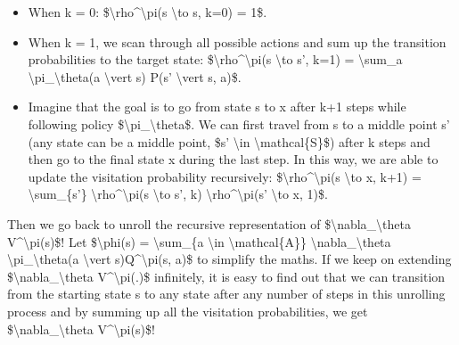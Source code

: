 \begin{itemize}
\tightlist
\item
  When k = 0: \$\textbackslash rho\^{}\textbackslash pi(s \textbackslash to s, k=0) = 1\$.
\item
  When k = 1, we scan through all possible actions and sum up the transition probabilities to the target state: \$\textbackslash rho\^{}\textbackslash pi(s \textbackslash to s', k=1) = \textbackslash sum\_a \textbackslash pi\_\textbackslash theta(a \textbackslash vert s) P(s' \textbackslash vert s, a)\$.
\item
  Imagine that the goal is to go from state s to x after k+1 steps while following policy \$\textbackslash pi\_\textbackslash theta\$. We can first travel from s to a middle point s' (any state can be a middle point, \$s' \textbackslash in \textbackslash mathcal\{S\}\$) after k steps and then go to the final state x during the last step. In this way, we are able to update the visitation probability recursively: \$\textbackslash rho\^{}\textbackslash pi(s \textbackslash to x, k+1) = \textbackslash sum\_\{s'\} \textbackslash rho\^{}\textbackslash pi(s \textbackslash to s', k) \textbackslash rho\^{}\textbackslash pi(s' \textbackslash to x, 1)\$.
\end{itemize}

Then we go back to unroll the recursive representation of \$\textbackslash nabla\_\textbackslash theta V\^{}\textbackslash pi(s)\$! Let \$\textbackslash phi(s) = \textbackslash sum\_\{a \textbackslash in \textbackslash mathcal\{A\}\} \textbackslash nabla\_\textbackslash theta \textbackslash pi\_\textbackslash theta(a \textbackslash vert s)Q\^{}\textbackslash pi(s, a)\$ to simplify the maths. If we keep on extending \$\textbackslash nabla\_\textbackslash theta V\^{}\textbackslash pi(.)\$ infinitely, it is easy to find out that we can transition from the starting state s to any state after any number of steps in this unrolling process and by summing up all the visitation probabilities, we get \$\textbackslash nabla\_\textbackslash theta V\^{}\textbackslash pi(s)\$!

